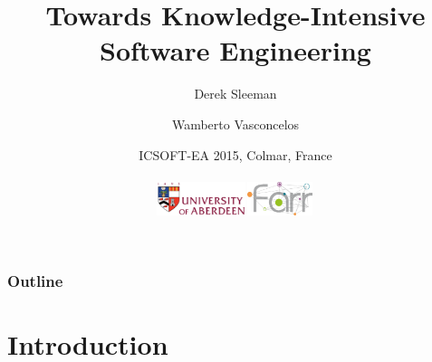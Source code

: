 \documentclass{beamer}
\newcommand{\myemph}[1]{{\bf {\color{emcolor}{#1}}}}
\begin{document}
\title{Towards Knowledge-Intensive Software Engineering}
\author{\myemph{Samuel Cauvin} \and Derek Sleeman \and Wamberto Vasconcelos}

\date{ICSOFT-EA 2015, Colmar, France\\ \\\includegraphics[height=1cm]{logo}\includegraphics[height=1cm,width=2cm]{logo-farr}}

\maketitle

\begin{frame}
  \frametitle{Outline}
  \tableofcontents
\end{frame}

\section{Introduction}
\subsection{}
\end{document}
